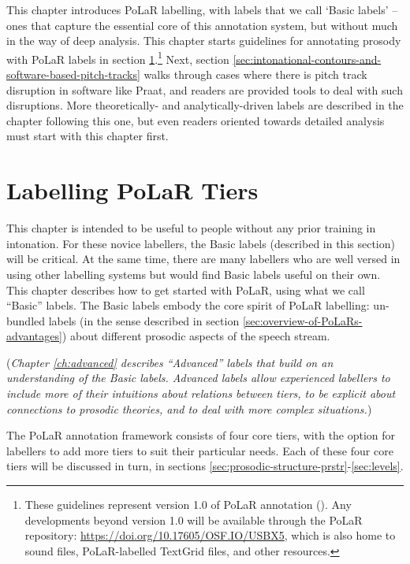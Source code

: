 \documentclass[11pt, twoside]{memoir}
\begin{document}
This chapter introduces PoLaR labelling, with labels that we call ‘Basic labels’ – ones that capture the essential core of this annotation system, but without much in the way of deep analysis. This chapter starts guidelines for annotating prosody with PoLaR labels in section  \ref{sec:labelling-polar-tiers}.\footnote{These guidelines represent version 1.0 of PoLaR annotation (\citealt{ahn-21}). Any developments beyond version 1.0 will be available through the PoLaR repository: \href{https://doi.org/10.17605/OSF.IO/USBX5}{https://doi.org/10.17605/OSF.IO/USBX5}, which is also home to sound files, PoLaR-labelled TextGrid files, and other resources.} Next, section \ref{sec:intonational-contours-and-software-based-pitch-tracks} walks through cases where there is pitch track disruption in software like Praat, and readers are provided tools to deal with such disruptions. More theoretically- and analytically-driven labels are described in the chapter following this one, but even readers oriented towards detailed analysis must start with this chapter first.

\section{Labelling PoLaR Tiers}\label{sec:labelling-polar-tiers}

This chapter is intended to be useful to people without any prior training in intonation. For these novice labellers, the Basic labels (described in this section) will be critical. At the same time, there are many labellers who are well versed in using other labelling systems but would find Basic labels useful on their own. This chapter describes how to get started with PoLaR, using what we call “Basic” labels. The Basic labels embody the core spirit of PoLaR labelling: un-bundled labels (in the sense described in section \ref{sec:overview-of-PoLaRs-advantages}) about different prosodic aspects of the speech stream.

(\textit{Chapter \ref{ch:advanced} describes “Advanced” labels that build on an understanding of the Basic labels. Advanced labels allow experienced labellers to include more of their intuitions about relations between tiers, to be explicit about connections to prosodic theories, and to deal with more complex situations.})

The PoLaR annotation framework consists of four core tiers, with the option for labellers to add more tiers to suit their particular needs. Each of these four core tiers will be discussed in turn, in sections \ref{sec:prosodic-structure-prstr}-\ref{sec:levels}.
\end{document}
